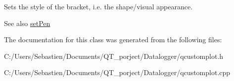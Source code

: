 Sets the style of the bracket, i.\+e. the shape/visual appearance.

\begin{DoxySeeAlso}{See also}
\hyperlink{class_q_c_p_item_bracket_ab13001d9cc5d8f9e56ea15bdda682acb}{set\+Pen} 
\end{DoxySeeAlso}


The documentation for this class was generated from the following files\+:\begin{DoxyCompactItemize}
\item 
C\+:/\+Users/\+Sebastien/\+Documents/\+Q\+T\+\_\+porject/\+Datalogger/qcustomplot.\+h\item 
C\+:/\+Users/\+Sebastien/\+Documents/\+Q\+T\+\_\+porject/\+Datalogger/qcustomplot.\+cpp\end{DoxyCompactItemize}

